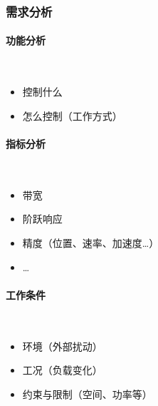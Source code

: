 \documentclass[14pt,a4paper]{article}
\theoremstyle{plain}
\theoremstyle{definition}
\theoremstyle{remark}
\theoremstyle{plain}
\theoremstyle{plain}
\theoremstyle{definition}
\begin{document}
			\subsubsection{需求分析}%
			\label{ssub:需求分析}
				
				\paragraph{功能分析}%
				\label{par:功能分析}
				
					\ 
					\begin{itemize}
						\item 控制什么
						\item 怎么控制（工作方式）
					\end{itemize} 

				\paragraph{指标分析}%
				\label{par:指标分析}
				
					\ 
					\begin{itemize}
						\item 带宽
						\item 阶跃响应 
						\item 精度（位置、速率、加速度\ldots） 
						\item \ldots
					\end{itemize}
		
				\paragraph{工作条件}%
				\label{par:工作条件}
					\ 
					\begin{itemize}
						\item 环境（外部扰动）
						\item 工况（负载变化）
						\item 约束与限制（空间、功率等）
					\end{itemize} 
\end{document}
